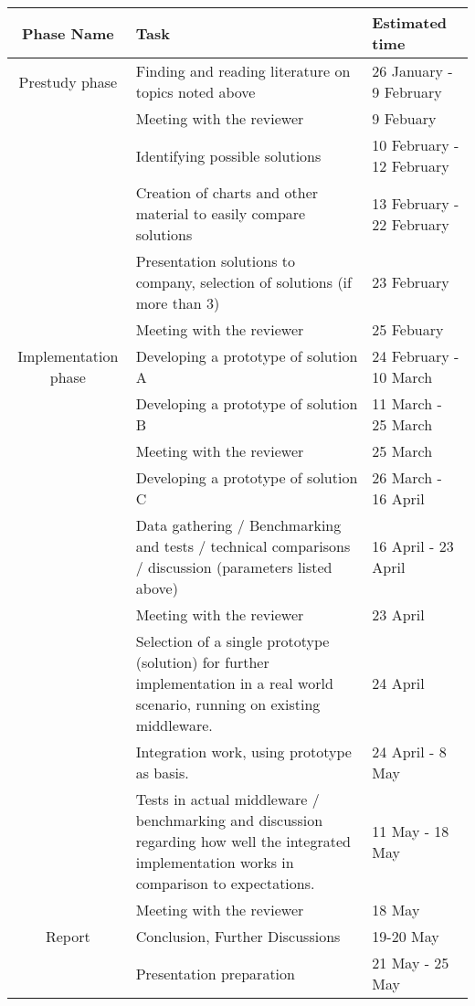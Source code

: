 \documentclass[11pt, a4paper]{scrartcl}
\begin{document}
\begin{tabular}{|c|p{8cm}|l|}
  \hline
  \textbf{Phase Name} & \textbf{Task} & \textbf{Estimated time} \\ \cline{2-2}
  \hline \hline
  Prestudy phase & Finding and reading literature on topics noted above & 26 January - 9 February  \\ \cline{2-2}
        & Meeting with the reviewer & 9 Febuary \\ \cline{2-2}
        & Identifying possible solutions & 10 February - 12 February \\ \cline{2-2} 
        & Creation of charts and other material to easily compare solutions  & 13 February - 22 February \\ \cline{2-2}
        & Presentation solutions to company, selection of solutions (if more than 3)& 23 February\\ \cline{2-2}
        & Meeting with the reviewer & 25 Febuary \\ \cline{2-2}
  \hline \hline
  Implementation phase &  Developing a prototype of solution A & 24 February - 10 March \\ \cline{2-2}
                       &  Developing a prototype of solution B & 11 March - 25 March \\ \cline{2-2}       & Meeting with the reviewer & 25 March \\ \cline{2-2}
                       &  Developing a prototype of solution C & 26 March - 16 April \\ \cline{2-2}
          & Data gathering / Benchmarking and tests / technical comparisons / discussion (parameters listed above) & 16 April - 23 April \\ \cline{2-2}
          & Meeting with the reviewer & 23 April \\ \cline{2-2}
          & Selection of a single prototype (solution) for further implementation in a real world scenario, running on existing middleware. & 24 April \\ \cline{2-2}
          & Integration work, using prototype as basis.& 24 April - 8 May \\ \cline{2-2}
          & Tests in actual middleware / benchmarking and discussion regarding how well the integrated implementation works in comparison to expectations.& 11 May - 18 May \\ \cline{2-2}
        & Meeting with the reviewer & 18 May \\ \cline{2-2}

  \hline \hline

    Report  &  Conclusion, Further Discussions & 19-20 May \\ \cline{2-2}
            &  Presentation preparation & 21 May - 25 May \\ \cline{2-2}
  \hline
\end{tabular}
\end{document}
